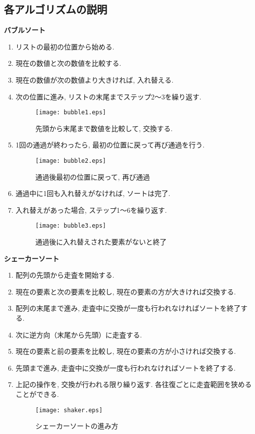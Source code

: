 \documentclass[a4j, 12pt]{jarticle}
\begin{document}
\subsection{各アルゴリズムの説明}
\textbf{バブルソート}
\begin{enumerate}
  \item リストの最初の位置から始める. 
  \item 現在の数値と次の数値を比較する. 
  \item 現在の数値が次の数値より大きければ, 入れ替える. 
  \item 次の位置に進み, リストの末尾までステップ2〜3を繰り返す. 
  \begin{figure}[H]
    \centering
    \texttt{[image: bubble1.eps]}
    \caption{先頭から末尾まで数値を比較して, 交換する. }
  \end{figure}
  \item 1回の通過が終わったら, 最初の位置に戻って再び通過を行う. 
  \begin{figure}[H]
    \centering
    \texttt{[image: bubble2.eps]}
    \caption{通過後最初の位置に戻って, 再び通過}
  \end{figure}
  \item 通過中に1回も入れ替えがなければ, ソートは完了. 
  \item 入れ替えがあった場合, ステップ1〜6を繰り返す. 
  \begin{figure}[H]
    \centering
    \texttt{[image: bubble3.eps]}
    \caption{通過後に入れ替えされた要素がないと終了}
  \end{figure}
\end{enumerate}
\textbf{シェーカーソート}
\begin{enumerate}
  \item 配列の先頭から走査を開始する. 
  \item 現在の要素と次の要素を比較し, 現在の要素の方が大きければ交換する. 
  \item 配列の末尾まで進み, 走査中に交換が一度も行われなければソートを終了する. 
  \item 次に逆方向（末尾から先頭）に走査する. 
  \item 現在の要素と前の要素を比較し, 現在の要素の方が小さければ交換する. 
  \item 先頭まで進み, 走査中に交換が一度も行われなければソートを終了する. 
  \item 上記の操作を, 交換が行われる限り繰り返す. 各往復ごとに走査範囲を狭めることができる. 
  \begin{figure}[H]
    \centering
    \texttt{[image: shaker.eps]}
    \caption{シェーカーソートの進み方}
  \end{figure}
\end{enumerate}
\end{document}
